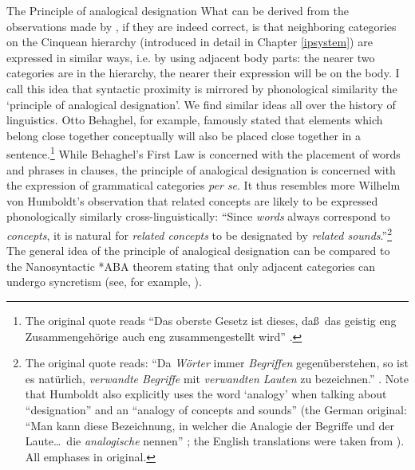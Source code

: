 \begin{savenotes}
\begin{digression}{The Principle of analogical designation}{}
\noindent What\label{analogicaldesignation} can be derived from the observations made by \citet{bross2017scope}, if they are indeed correct, is that neighboring categories on the Cinquean hierarchy (introduced in detail in Chapter \ref{ipsystem}) are expressed in similar ways, i.e. by using adjacent body parts: the nearer two categories are in the hierarchy, the nearer their expression will be on the body. I call this idea that syntactic proximity is mirrored by phonological similarity the `principle of analogical designation'. We find similar ideas all over the history of linguistics. Otto Behaghel, for example, famously stated that elements which belong close together conceptually will also be placed close together in a sentence.\footnote{The original quote reads ``Das oberste Gesetz ist dieses, da\ss\ das geistig eng Zusammengehörige auch eng zusammengestellt wird'' \citep[4]{behaghel1932}.} While Behaghel's First Law is concerned with the placement of words and phrases in clauses, the principle of analogical designation is concerned with the expression of grammatical categories \textit{per se}. It thus resembles more Wilhelm von Humboldt's observation that related concepts are likely to be expressed phonologically similarly cross-linguistically: ``Since \textit{words} always correspond to \textit{concepts}, it is natural for \textit{related concepts} to be designated by \textit{related sounds}.''\footnote{The original quote reads: ``Da \textit{Wörter} immer \textit{Begriffen} gegenüberstehen, so ist es natürlich, \textit{verwandte Begriffe} mit \textit{verwandten Lauten} zu bezeichnen.'' \citep[75]{von1836kawi}. Note that Humboldt also explicitly uses the word `analogy' when talking about ``designation'' and an ``analogy of concepts and sounds'' (the German original: ``Man kann diese Bezeichnung, in welcher die Analogie der Begriffe und der Laute\dots\ die \textit{analogische} nennen'' \citealt[81]{von1836kawi}; the English translations were taken from \citealt{humboldt1999language}). All emphases in original. } The general idea of the principle of analogical designation can be compared to the Nanosyntactic *ABA theorem stating that only adjacent categories can undergo syncretism (see, for example, \citealt{bobalji2007comparative,bobalji2012universals,caha2009nanosyntax}).


\end{digression}
\end{savenotes}
